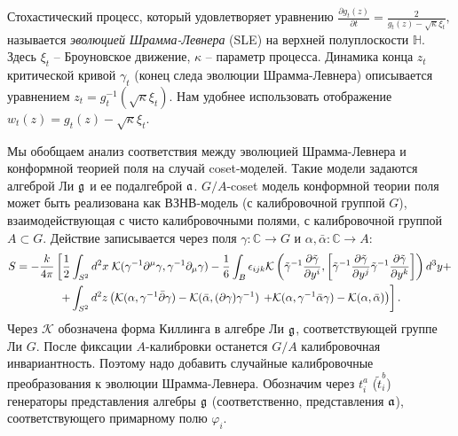 \documentclass[14pt,autoref,href,facsimile
]{disser}
\begin{document}
Стохастический процесс, который удовлетворяет уравнению 
$
  \frac{\partial g_t(z)}{\partial t} = \frac{ 2}{g_t(z)-\sqrt{\kappa}\xi_{t}} ,
$
называется {\it эволюцией Шрамма-Левнера} (SLE) на верхней полуплоскости $\mathbb{H}$. Здесь $\xi_{t}$ -- Броуновское движение, $\kappa$ -- параметр процесса. Динамика конца  $z_{t}$ критической кривой $\gamma_{t}$ (конец следа эволюции Шрамма-Левнера) описывается уравнением $z_{t}=g_{t}^{-1}(\sqrt{\kappa}\xi_{t})$. Нам удобнее использовать отображение $w_{t} (z)=g_{t}(z)-\sqrt{\kappa}\xi_{t}$. 

Мы обобщаем анализ соответствия между эволюцией Шрамма-Левнера и конформной теорией поля на случай coset-моделей. Такие модели задаются алгеброй Ли $\mathfrak{g}$ и ее подалгеброй $\mathfrak{a}$. 
$G/A$-coset модель конформной теории поля может быть реализована как ВЗНВ-модель (с калибровочной группой $G$), взаимодействующая с чисто калибровочными полями, с калибровочной группой $A\subset G$. Действие записывается через поля $\gamma:\mathbb{C}\to G$ и $\alpha,\bar\alpha:\mathbb{C}\to A$:
\begin{multline}
\label{eq:178}
      S=
-\frac{k}{4\pi}\left[ \frac{1}{2} \int_{S^2} d^2x\; {\cal K} (\gamma^{-1}\partial^{\mu}\gamma,\gamma^{-1}\partial_{\mu}\gamma)-
 \frac{1 }{6} \int_{B}\epsilon_{ijk} {\cal K}\left(
    \tilde \gamma^{-1}\frac{\partial \tilde \gamma}{\partial y^i},
      \left[\tilde \gamma^{-1}\frac{\partial \tilde \gamma}{\partial y^j}
      \tilde \gamma^{-1}\frac{\partial \tilde \gamma}{\partial y^k}\right]\right) d^3y+\right.\\
\left.+
 \int_{S^2} d^{2}z \left(\mathcal{K}(\alpha, \gamma^{-1}\bar \partial \gamma)-\mathcal{K}(\bar \alpha, (\partial \gamma ) \gamma^{-1})\right.
      \left.+\mathcal{K}(\alpha,\gamma^{-1}\bar \alpha \gamma)-\mathcal{K}(\alpha,\bar \alpha)\right)\right].
\end{multline}
Через  $\mathcal{K}$ обозначена форма Киллинга в алгебре Ли $\mathfrak{g}$, соответствующей группе Ли $G$.
После фиксации  $A$-калибровки останется  $G/A$ калибровочная инвариантность. Поэтому надо добавить случайные калибровочные преобразования к эволюции Шрамма-Левнера. Обозначим через $t^{a}_{i}$ ($\tilde{t}^{b}_{i}$) генераторы представления алгебры $\mathfrak{g}$ (соответственно, представления $\mathfrak{a}$), соответствующего примарному полю $\varphi_{i}$.
\end{document}
